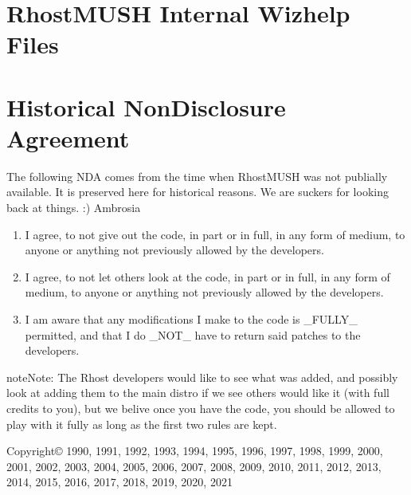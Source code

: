 \documentclass[letterpaper,10pt,english]{sphinxmanual}
\begin{document}
\chapter{RhostMUSH Internal Wizhelp Files}
\label{\detokenize{wizhelp:rhostmush-internal-wizhelp-files}}\label{\detokenize{wizhelp::doc}}



\chapter{Historical Non\sphinxhyphen{}Disclosure Agreement}
\label{\detokenize{nda:historical-non-disclosure-agreement}}\label{\detokenize{nda::doc}}
\sphinxAtStartPar
The following NDA comes from the time when RhostMUSH was not publially
available. It is preserved here for historical reasons. We are suckers for
looking back at things. :)
\textendash{}Ambrosia
\begin{enumerate}
%
\item {} 
\sphinxAtStartPar
I agree, to not give out the code, in part or in full, in any form of
medium, to anyone or anything not previously allowed by the developers.

\item {} 
\sphinxAtStartPar
I agree, to not let others look at the code, in part or in full, in
any form of medium, to anyone or anything not previously allowed by the
developers.

\item {} 
\sphinxAtStartPar
I am aware that any modifications I make to the code is \_FULLY\_
permitted, and that I do \_NOT\_ have to return said patches to the
developers.

\end{enumerate}

\begin{sphinxadmonition}{note}{Note:}
\sphinxAtStartPar
The Rhost developers would like to see what was added, and possibly
look at adding them to the main distro if we see others would like
it (with full credits to you), but we belive once you have the code,
you should be allowed to play with it fully as long as the first two
rules are kept.
\end{sphinxadmonition}

\sphinxAtStartPar
Copyright© 1990, 1991, 1992, 1993, 1994, 1995, 1996, 1997, 1998, 1999,
2000, 2001, 2002, 2003, 2004, 2005, 2006, 2007, 2008, 2009, 2010, 2011, 2012,
2013, 2014, 2015, 2016, 2017, 2018, 2019, 2020, 2021
\end{document}
